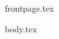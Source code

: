 \documentclass[11pt]{llncs}
\begin{document}
{frontpage.tex}


{body.tex}

\iflncs
  \thispagestyle{plain}
\fi

\ifccs
  
\fi
\iflncs
  
\fi
\ifoakland
  
\fi

\end{document}
